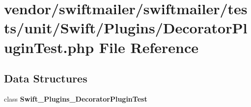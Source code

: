 \section{vendor/swiftmailer/swiftmailer/tests/unit/\+Swift/\+Plugins/\+Decorator\+Plugin\+Test.php File Reference}
\label{_decorator_plugin_test_8php}
\subsection*{Data Structures}
\begin{DoxyCompactItemize}
\item 
class {\bf Swift\+\_\+\+Plugins\+\_\+\+Decorator\+Plugin\+Test}
\end{DoxyCompactItemize}
